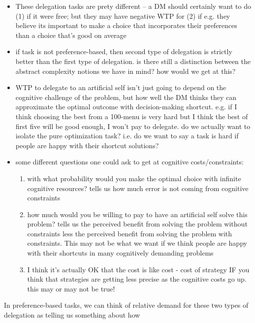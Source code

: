 \documentclass[12pt]{article}
\begin{document}
\begin{itemize}
  \item These delegation tasks are prety different -- a DM should certainly want to do (1) if it were free; but they may have negative WTP for (2) if e.g. they believe its important to make a choice that incorporates their preferences than a choice that's good on average
  \item if task is not preference-based, then second type of delegation is strictly better than the first type of delegation. is there still a distinction between the abstract complexity notions we have in mind? how would we get at this?
  \item WTP to delegate to an artificial self isn't just going to depend on the cognitive challenge of the problem, but how well the DM thinks they can approximate the optimal outcome with decision-making shortcut. e.g. if I think choosing the best from a 100-menu is very hard but I think the best of first five will be good enough, I won't pay to delegate. do we actually want to isolate the pure optimization task? i.e. do we want to say a task is hard if people are happy with their shortcut solutions?
  \item some different questions one could ask to get at cognitive costs/constraints:
  \begin{enumerate}
    \item with what probability would you make the optimal choice with infinite cognitive resources? tells us how much error is not coming from cognitive constraints
    \item how much would you be willing to pay to have an artificial self solve this problem? tells us the perceived benefit from solving the problem without constraints less the perceived benefit from solving the problem with constraints. This may not be what we want if we think people are happy with their shortcuts in many cognitively demanding problems
    \item I think it's actually OK that the cost is like cost - cost of strategy IF you think that strategies are getting less precise as the cognitive costs go up. this may or may not be true!
  \end{enumerate}
\end{itemize}

In preference-based tasks, we can think of relative demand for these two types of delegation as telling us something about how 
\end{document}
